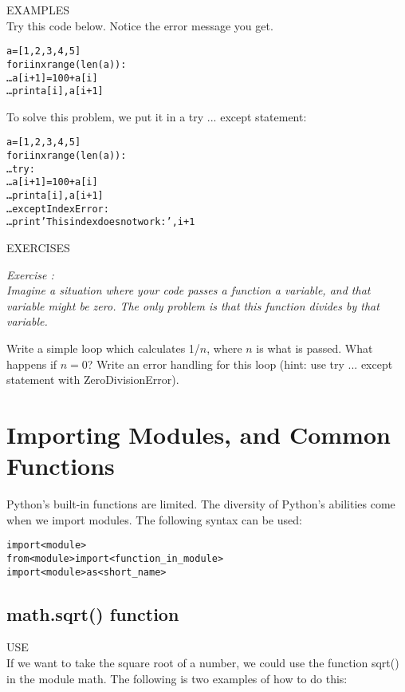 {\color{blue} {\sf\small EXAMPLES}} \\
Try this code below.  Notice the error message you get.
\begin{alltt}
\pytab a = [1, 2, 3, 4, 5]  
\pytab for i in xrange(len(a)): 
\ldots    a[i + 1] = 100 + a[i] 
\ldots    print a[i], a[i + 1] 
\end{alltt}
To solve this problem, we put it in a {\sf\small try ... except}
statement: 
\begin{alltt}
\pytab a = [1, 2, 3, 4, 5] 
\pytab for i in xrange(len(a)): 
\ldots     try:  
\ldots         a[i + 1] = 100 + a[i] 
\ldots         print a[i], a[i + 1] 
\ldots     except IndexError: 
\ldots         print 'This index does not work: ',i + 1
\end{alltt}

{\color{blue} {\sf\small EXERCISES}} \\
{\it Exercise  :  \\
  Imagine a situation where your code passes a function a variable,
  and that variable might be zero.  The only problem is that this
  function divides by that variable.
  
  Write a simple loop which calculates 1/$n$, where $n$ is what is
  passed.  What happens if $n=0$?  Write an error handling for this loop
  (hint: use {\sf\small try ... except} statement with
  ZeroDivisionError).}

\section{Importing Modules, and Common Functions}
\label{s:mod}
Python's built-in functions are limited.  The diversity of Python's
abilities come when we import modules.  The following syntax can be
used: 

\begin{alltt}
\pytab import <module>
\pytab from <module> import <function_in_module>
\pytab import <module> as <short_name>
\end{alltt}

\subsection{ {\sf math.sqrt() } function} 
{\color{blue} {\sf\small USE}} \\
If we want to take the square root of a number, we could
use the function {\sf\small sqrt()} in the module {\sf \small math}.  The following is two
examples of how to do this:
  
